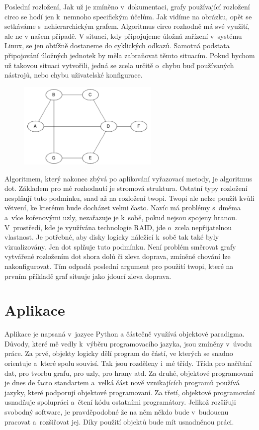 \documentclass[color,table,oneside,nolot,nolof]{fithesis}
\begin{document}
	Poslední rozložení, \cite{graphviz_layout} 
	Jak už je zmíněno v~dokumentaci, grafy používající rozložení 
	circo se hodí jen k~nemnoho specifickým účelům. Jak vidíme na obrázku, opět se setkáváme s~nehierarchickým grafem. Algoritmus circo rozhodně má své využití, ale ne v našem případě. V
	situaci, kdy připojujeme úložná zařízení v~systému Linux, se jen obtížně dostaneme do cyklických odkazů. Samotná podstata připojování úložných jednotek by měla zabraňovat těmto
	situacím. Pokud bychom už takovou situaci vytvořili, jedná se zcela určitě o~chybu buď používaných nástrojů, nebo chybu uživatelské konfigurace. 
\begin{figure}
	\centering
	\includegraphics[width=0.6\textwidth]{pictures/circo_example.png} 
\end{figure}

	Algoritmem, který nakonec zbývá po aplikování vyřazovací metody, je algoritmus dot. 
	Základem pro mé rozhodnutí je stromová struktura. Ostatní typy rozložení nesplňují tuto podmínku, snad až na rozložení twopi. Twopi ale nelze použít kvůli větvení,
	ke kterému bude docházet velmi často. Navíc má problémy s~dměma a~více kořenovými uzly, nezařazuje je k~sobě, pokud nejsou spojeny hranou. V~prostředí, kde je využívána technologie
	RAID, jde o~zcela nepřijatelnou vlastnost. Je potřebné, aby disky logicky náležící k~sobě tak také byly vizualizovány. Jen dot splňuje tuto podmínku. Není problém směrovat grafy 
	vytvářené rozložením dot shora dolů či zleva doprava, zmíněné chování lze nakonfigurovat. Tím odpadá poslední argument pro použití twopi, které na prvním příkladě graf situuje jako
	jdoucí zleva doprava.

\chapter{Aplikace}
	Aplikace je napsaná v~jazyce Python a částečně využívá objektové paradigma. Důvody, které mě vedly k~výběru programovacího jazyka, jsou zmíněny v~úvodu práce. Za prvé, objekty logicky
	dělí program do částí, ve kterých se snadno orientuje a~které spolu souvisí. Tak jsou rozděleny i~mé třídy. Třída pro načítání dat, pro tvorbu grafu, pro uzly, pro hrany atd.
	Za druhé, objektové programovaní je dnes de facto standartem a~velká část nově vznikajících programů používá jazyky, které podporují objektové programovaní. Za třetí,
	objektové programování usnadňuje spolupráci a~čtení kódu ostatními programátory. Jelikož rozšiřuji svobodný software, je pravděpodobné že na něm někdo bude v~budoucnu pracovat
	a~rozšiřovat jej. Díky použití objektů bude mít usnadněnou práci.
	
\end{document}
